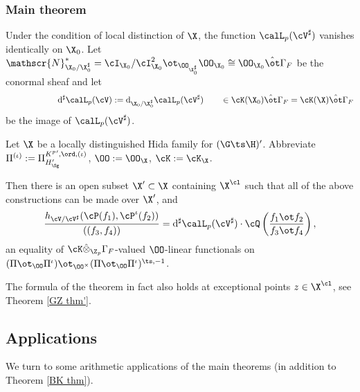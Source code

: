 \subsubsection{Main theorem}
Under the condition of local distinction of $\X$,   the function  $\calL_{p}(\cV^{\sharp})$ vanishes identically on $\X_{0}$. Let   $\mathscr{N}^{*}_{\X_{0}/\X_{0}^{\sharp}} =\cI_{\X_{0}}/\cI_{\X_{0}}^{2}\ot_{\OO_{\X_{0}^{\sharp}}}\OO_{\X_{0}}  \cong \OO_{\X_{0}}\hat{\ot}\Gamma_{F}$  be the conormal sheaf and let
$$\qquad \qquad \qquad {\rm d}^{\sharp}\calL_{p}(\cV):={\rm d}_{\X_{0}/\X_{0}^{\sharp}} \calL_{p}(\cV^{\sharp})  \qquad \in \cK(\X_{0})\hat{\ot}\Gamma_{F}= \cK(\X)\hat{\ot}\Gamma_{F}$$ be the  image of $\calL_{p}(\cV^{\sharp})$.





\begin{theoA}\label{ugz thm} Let $\X$ be a locally distinguished Hida family for $(\G\ts\H)'$. Abbreviate $\Pi^{(\iota)}:=  \Pi^{K^{p}{}', \ord, (\iota)}_{H'_{\Sg}}$, $\OO:=\OO_{\X}$, $\cK:=\cK_{\X}$.

Then there is an
open subset $\X'\subset \X$ containing $\X^{\cl}$ such that all of  the above constructions   can be made over $\X'$,  and
$$   {  h_{\cV/\cV^{\sharp}}(\cP(f_{1}), \cP^{\iota}(f_{2}))    \over   ((f_{3}, f_{4}))      }
=
 {\rm d}^{\sharp} \calL_{p}(\cV^{\sharp})
\cdot
\cQ\left( {  f_{1} \ot  f_{2}\over f_{3}\ot f_{4}}\right),
$$
 an equality of $\cK\hat{\otimes}_{\Z_{p}}\Gamma_{F}$-valued $\OO$-linear  functionals on $(\Pi\ot_{\OO} \Pi^{\iota})\ot_{\OO^{\times}} (\Pi\ot_{\OO} \Pi^{\iota})^{\ts, -1}$.
\end{theoA}
The formula of the theorem  in fact also holds at exceptional points $z\in \X^{\cl}$, see Theorem \ref{GZ thm'}.

\subsection{Applications}
We turn to some  arithmetic  applications of the main theorems (in addition to Theorem \ref{BK thm}).


